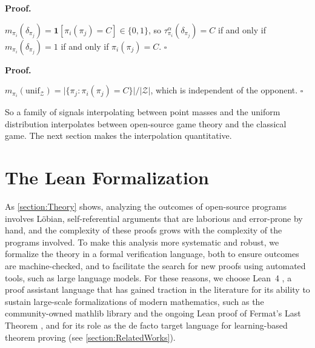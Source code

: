 \documentclass[twoside,11pt]{article}
\renewcommand{\BlackBox}{\ensuremath{\square}}
\renewenvironment{proof}[1][Proof]{%
  \par\noindent\textbf{#1.}\enspace\ignorespaces
}{%
  \ifhmode\unskip\nobreak\hfill\quad\else\noindent\hfill\fi
  \BlackBox\par\addvspace{2mm}%
}
\begin{document}
\begin{proposition}[Anchor]\label[proposition]{prop:Theory-Anchor}
For every $\pi_i, \pi_j \in \mathcal{Z}$ and $\alpha \in (0,1]$, $\tau_{\pi_i}^{\alpha}(\delta_{\pi_j}) = \pi_i(\pi_j)$. Consequently $\mathrm{outcome}^{\delta,\alpha} = \mathrm{outcome}$ on $\mathcal{Z} \times \mathcal{Z}$, and $G_{PD}^{\tau}(\delta,\alpha)$ is $G_{PD}^{\mathrm{prog}}$ restricted to the zoo.
\end{proposition}
\begin{proof}
$m_{\pi_i}(\delta_{\pi_j}) = \mathbf{1}[\pi_i(\pi_j) = C] \in \{0,1\}$, so $\tau_{\pi_i}^{\alpha}(\delta_{\pi_j}) = C$ if and only if $m_{\pi_i}(\delta_{\pi_j}) = 1$ if and only if $\pi_i(\pi_j) = C$.
\end{proof}
\begin{proof}
$m_{\pi_i}(\mathrm{unif}_{\mathcal{Z}}) = \big|\{\pi_j : \pi_i(\pi_j) = C\}\big| / |\mathcal{Z}|$, which is independent of the opponent.
\end{proof}
So a family of signals interpolating between point masses and the uniform distribution interpolates between open-source game theory and the classical game. The next section makes the interpolation quantitative.






\newpage
\section{The Lean Formalization}
\label{section:Lean}
As \cref{section:Theory} shows, analyzing the outcomes of open-source programs involves Löbian, self-referential arguments that are laborious and error-prone by hand, and the complexity of these proofs grows with the complexity of the programs involved. To make this analysis more systematic and robust, we formalize the theory in a formal verification language, both to ensure outcomes are machine-checked, and to facilitate the search for new proofs using automated tools, such as large language models. For these reasons, we choose Lean~4 \citep{Lean4}, a proof assistant language that has gained traction in the literature for its ability to sustain large-scale formalizations of modern mathematics, such as the community-owned mathlib library \citep{mathlib2020} and the ongoing Lean proof of Fermat's Last Theorem \citep{FLT_Lean}, and for its role as the de facto target language for learning-based theorem proving (see \cref{section:RelatedWorks}). 
\end{document}
